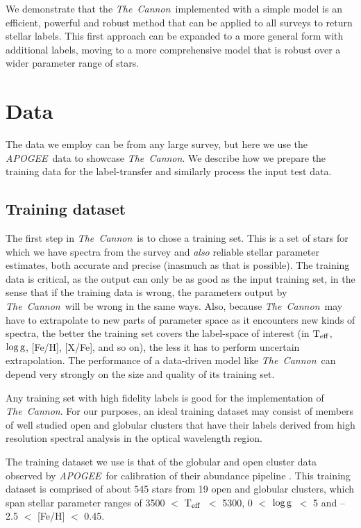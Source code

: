 \documentclass[12pt, preprint]{aastex}
\newcommand{\teff}{\mbox{$\rm T_{eff}$}}
\newcommand{\logg}{\mbox{$\rm \log g$}}
\newcommand{\tc}{\textsl{The~Cannon}}
\newcommand{\apogee}{\textsl{APOGEE}}
\begin{document}
We demonstrate that the \tc\ implemented with a simple model is an efficient, powerful and robust method that can be applied to all surveys to return stellar labels. This first approach can be expanded to a more general form with additional labels, moving to a more comprehensive model that is robust over a wider parameter range of stars. 

\section{Data}

The data we employ can be from any large survey, but here we use the \apogee\ data to showcase \tc . We describe how we prepare the training data for the label-transfer and similarly process the input test data.

\subsection{Training dataset}

The first step in \tc\ is to chose a training set. This is a set of stars for which we have spectra from the survey and
\emph{also} reliable stellar parameter estimates, both accurate and
precise (inasmuch as that is possible).
The training data is critical, as the output can only be as good as
the input training set, in the sense that if the training data is
wrong, the parameters output by \tc\ will be wrong in the same ways.
Also, because \tc\ may have to extrapolate to new parts of parameter
space as it encounters new kinds of spectra, the better the training
set covers the label-space of interest (in \teff, \logg, [Fe/H],
[X/Fe], and so on), the less it has to perform uncertain
extrapolation.
The performance of a data-driven model like \tc\ can depend very
strongly on the size and quality of its training set.

Any training set with high fidelity labels is good for the implementation of \tc. For our purposes, an ideal training dataset may consist of members of
well studied open and globular clusters that have their labels derived from high resolution spectral analysis in the
optical wavelength region.


The training dataset we use is that of the globular and open cluster data observed by \apogee\ for calibration of their abundance pipeline \citep{Meszaros2013}. This training dataset is comprised of about 545 stars from 19 open and globular clusters, which span stellar parameter ranges of 3500 $<$ \teff\ $<$ 5300, 0 $<$ \logg\ $<$ 5 and --2.5 $<$ [Fe/H] $<$ 0.45. 
\end{document}
